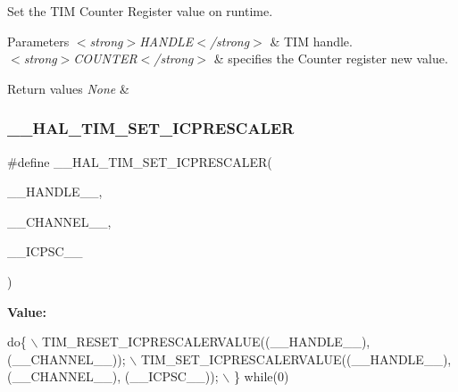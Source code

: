 Set the T\+IM Counter Register value on runtime. 


\begin{DoxyParams}{Parameters}
{\em $<$strong$>$\+H\+A\+N\+D\+L\+E$<$/strong$>$} & T\+IM handle. \\
\hline
{\em $<$strong$>$\+C\+O\+U\+N\+T\+E\+R$<$/strong$>$} & specifies the Counter register new value. \\
\hline
\end{DoxyParams}

\begin{DoxyRetVals}{Return values}
{\em None} & \\
\hline
\end{DoxyRetVals}
\mbox{\label{group___t_i_m___exported___macros_gaeb106399b95ef02cec502f58276a0e92}} 
\subsubsection{\texorpdfstring{\+\_\+\+\_\+\+H\+A\+L\+\_\+\+T\+I\+M\+\_\+\+S\+E\+T\+\_\+\+I\+C\+P\+R\+E\+S\+C\+A\+L\+ER}{\_\_HAL\_TIM\_SET\_ICPRESCALER}}
{\footnotesize\ttfamily \#define \+\_\+\+\_\+\+H\+A\+L\+\_\+\+T\+I\+M\+\_\+\+S\+E\+T\+\_\+\+I\+C\+P\+R\+E\+S\+C\+A\+L\+ER(\begin{DoxyParamCaption}\item[{}]{\+\_\+\+\_\+\+H\+A\+N\+D\+L\+E\+\_\+\+\_\+,  }\item[{}]{\+\_\+\+\_\+\+C\+H\+A\+N\+N\+E\+L\+\_\+\+\_\+,  }\item[{}]{\+\_\+\+\_\+\+I\+C\+P\+S\+C\+\_\+\+\_\+ }\end{DoxyParamCaption})}

{\bfseries Value\+:}
\begin{DoxyCode}
\textcolor{keywordflow}{do}\{                                                    \(\backslash\)
                              TIM\_RESET\_ICPRESCALERVALUE((\_\_HANDLE\_\_), (\_\_CHANNEL\_\_));  \(\backslash\)
                              TIM\_SET\_ICPRESCALERVALUE((\_\_HANDLE\_\_), (\_\_CHANNEL\_\_), (\_\_ICPSC\_\_)); \(\backslash\)
                          \} \textcolor{keywordflow}{while}(0)
\end{DoxyCode}


